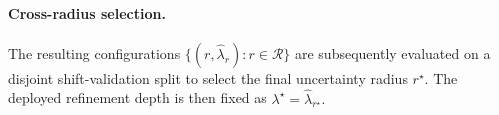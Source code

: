 \paragraph{Cross-radius selection.}
The resulting configurations
$
\{(r,\widehat\lambda_r):r\in\mathcal R\}
$
are subsequently evaluated on a disjoint shift-validation split to
select the final uncertainty radius $r^\star$. The deployed refinement
depth is then fixed as
$
\lambda^\star
=
\widehat\lambda_{r^\star}.
$







